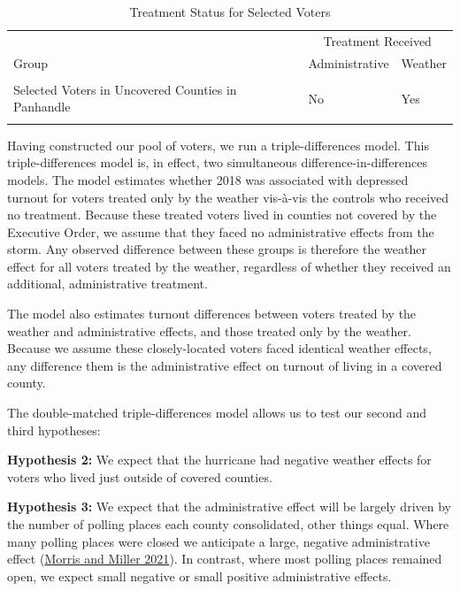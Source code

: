 \documentclass[
  12pt,
]{article}
\begin{document}
\begin{singlespace}
\begin{table}[H]

\caption{\label{tab:groups-treat}\label{tab:groups} Treatment Status for Selected Voters}
\centering
\begin{tabular}[t]{>{\raggedright\arraybackslash}p{15em}ll}
\toprule
\multicolumn{1}{c}{ } & \multicolumn{2}{c}{Treatment Received} \\
\cmidrule(l{3pt}r{3pt}){2-3}
Group & Administrative & Weather\\
\midrule
\cellcolor{gray!6}{Selected Voters in Covered Counties} & \cellcolor{gray!6}{Yes} & \cellcolor{gray!6}{Yes}\\
Selected Voters in Uncovered Counties in Panhandle & No & Yes\\
\cellcolor{gray!6}{Selected Voters Elsewhere} & \cellcolor{gray!6}{No} & \cellcolor{gray!6}{No}\\
\bottomrule
\end{tabular}
\end{table}
\end{singlespace}

Having constructed our pool of voters, we run a triple-differences model. This triple-differences model is, in effect, two simultaneous difference-in-differences models. The model estimates whether 2018 was associated with depressed turnout for voters treated only by the weather vis-à-vis the controls who received no treatment. Because these treated voters lived in counties not covered by the Executive Order, we assume that they faced no administrative effects from the storm. Any observed difference between these groups is therefore the weather effect for all voters treated by the weather, regardless of whether they received an additional, administrative treatment.

The model also estimates turnout differences between voters treated by the weather and administrative effects, and those treated only by the weather. Because we assume these closely-located voters faced identical weather effects, any difference them is the administrative effect on turnout of living in a covered county.

The double-matched triple-differences model allows us to test our second and third hypotheses:

\textbf{Hypothesis 2:} We expect that the hurricane had negative weather effects for voters who lived just outside of covered counties.

\textbf{Hypothesis 3:} We expect that the administrative effect will be largely driven by the number of polling places each county consolidated, other things equal. Where many polling places were closed we anticipate a large, negative administrative effect (\protect\hyperlink{ref-Morris2021}{Morris and Miller 2021}). In contrast, where most polling places remained open, we expect small negative or small positive administrative effects.
\end{document}
